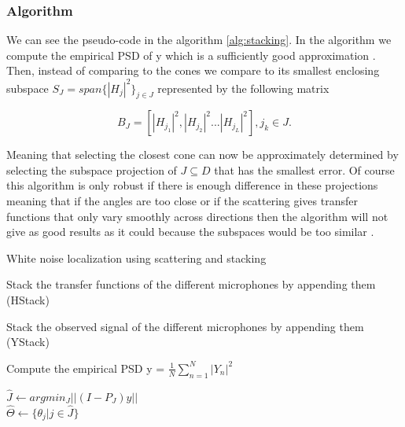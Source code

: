 \subsubsection{Algorithm}

We can see the pseudo-code in the algorithm \ref{alg:stacking}. In the algorithm we compute the empirical PSD of y which is a sufficiently good approximation \cite{dalia}\cite{Ledoux}. Then, instead of comparing to the cones we compare to its smallest enclosing subspace $S_J = span \{|H_j|^2\}_{j \in J}$ represented by the following matrix 

\begin{equation}
    B_J = [|H_{j_1}|^2, |H_{j_2}|^2 ... |H_{j_L}|^2], j_k \in J.
\end{equation}

Meaning that selecting the closest cone can now be approximately determined by selecting the subspace projection of $J \subseteq D$ that has the smallest error. Of course this algorithm is only robust if there is enough difference in these projections meaning that if the angles are too close or if the scattering gives transfer functions that only vary smoothly across directions then the algorithm will not give as good results as it could because the subspaces would be too similar \cite{dalia}.

\begin{algorithm}[H]
\caption{White noise localization using scattering and stacking}\label{alg:stacking}
  Stack the transfer functions of the different microphones by appending them (HStack)
  
  Stack the observed signal of the different microphones by appending them (YStack)
  
  Compute the empirical PSD y = $\frac{1}{N} \sum_{n=1}^N |Y_n|^2$
    
    $\hat J \gets  argmin_J ||(I - P_J)y||$
    \\$\hat \Theta \gets \{\theta _j | j \in \hat J\} $
\end{algorithm}
